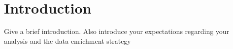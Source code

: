 \section{Introduction}
Give a brief introduction.
Also introduce your expectations regarding your analysis and the data enrichment strategy



